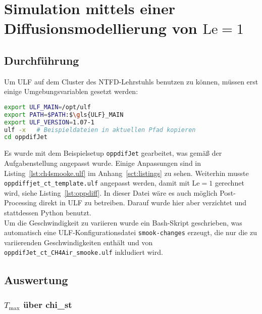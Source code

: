 
\section{Simulation mittels einer Diffusionsmodellierung von \texorpdfstring{$\mathrm{Le}=1$}{Le=1}}
\label{sct:oppdiffLe=1}

\subsection{Durchführung}
\label{sct:oppdiffLe1-execution}

Um \gls{ULF} auf dem Cluster des NTFD-Lehrstuhls benutzen zu können, müssen erst einige Umgebungsvariablen gesetzt werden:
\begin{lstlisting}[language=bash]
export ULF_MAIN=/opt/ulf
export PATH=$PATH:$\gls{ULF}_MAIN
export ULF_VERSION=1.07-1
ulf -x   # Beispieldateien in aktuellen Pfad kopieren
cd oppdifJet
\end{lstlisting}\vspace{-2\baselineskip}
Es wurde mit dem Beispielsetup \lstinline!oppdifJet! gearbeitet, was gemäß der Aufgabenstellung angepasst wurde. Einige Anpassungen sind in Listing~\ref{lst:ch4smooke.ulf} im Anhang~\ref{sct:listings} zu sehen. Weiterhin musste \lstinline!oppdiffjet_ct_template.ulf! angepasst werden, damit mit $\mathrm{Le}=1$ gerechnet wird, siehe Listing~\ref{lst:oppdiff}. In dieser Datei wäre es auch möglich Post-Processing direkt in \gls{ULF} zu betreiben. Darauf wurde hier aber verzichtet und stattdessen Python benutzt.\\

Um die Geschwindigkeit zu variieren wurde ein Bash-Skript geschrieben, was automatisch eine \gls{ULF}-Konfigurationsdatei \lstinline!smook-changes! erzeugt, die nur die zu variierenden Geschwindigkeiten enthält und von \lstinline!oppdifJet_ct_CH4Air_smooke.ulf! inkludiert wird.

\subsection{Auswertung}
\subsubsection{\texorpdfstring{$T_\mathrm{max}$}{Tmax} über \texorpdfstring{\gls{chi_st}}{chist}}
\label{sct:oppdiffLe1:Tmax-chist}

